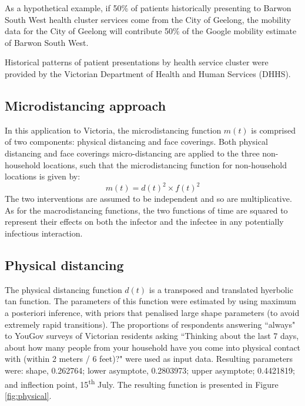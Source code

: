 As a hypothetical example, if 50\% of patients historically presenting to Barwon South West health cluster services come from the City of Geelong, the mobility data for the City of Geelong will contribute 50\% of the Google mobility estimate of Barwon South West.

Historical patterns of patient presentations by health service cluster were provided by the Victorian Department of Health and Human Services (DHHS).

\subsection{Microdistancing approach}
In this application to Victoria, the microdistancing function \(m(t)\) is comprised of two components: physical distancing and face coverings. Both physical distancing and face coverings micro-distancing are applied to the three non-household locations, such that the microdistancing function for non-household locations is given by: \[m(t)=d(t)^2\times f(t)^2\]
The two interventions are assumed to be independent and so are multiplicative. As for the macrodistancing functions, the two functions of time are squared to represent their effects on both the infector and the infectee in any potentially infectious interaction.

\subsection{Physical distancing}
The physical distancing function \(d(t)\) is a transposed and translated hyerbolic tan function. The parameters of this function were estimated by using maximum a posteriori inference, with priors that penalised large shape parameters (to avoid extremely rapid transitions). The proportions of respondents answering ``always" to YouGov surveys of Victorian residents asking ``Thinking about the last 7 days, about how many people from your household have you come into physical contact with (within 2 meters / 6 feet)?" were used as input data. Resulting parameters were: shape, 0.262764; lower asymptote, 0.2803973; upper asymptote; 0.4421819; and inflection point, 15\textsuperscript{th} July. The resulting function is presented in Figure \ref{fig:physical}.


